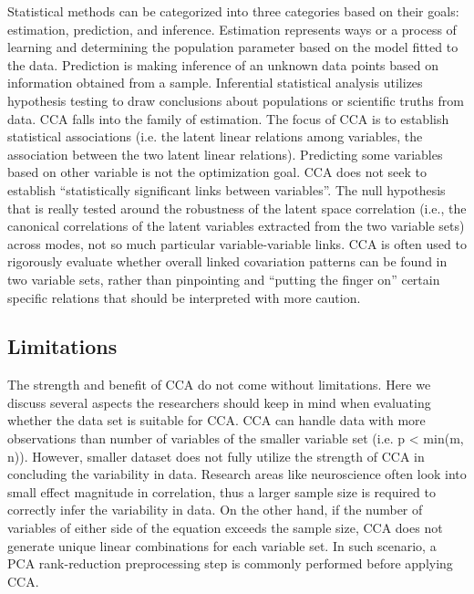 Statistical methods can be categorized into three categories based on their goals: estimation, prediction, and inference.  Estimation represents ways or a process of learning and determining the population parameter based on the model fitted to the data. Prediction is making inference of an unknown data points based on information obtained from a sample. Inferential statistical analysis utilizes hypothesis testing to draw conclusions about populations or scientific truths from data. CCA falls into the family of estimation. The focus of CCA is to establish statistical associations (i.e. the latent linear relations among variables, the association between the two latent linear relations). Predicting some variables based on other variable is not the optimization goal. CCA does not seek to establish “statistically significant links between variables”. The null hypothesis that is really tested around the robustness of the latent space correlation (i.e., the canonical correlations of the latent variables extracted from the two variable sets) across modes, not so much particular variable-variable links. CCA is often used to rigorously evaluate whether overall linked covariation patterns can be found in two variable sets, rather than pinpointing and “putting the finger on” certain specific relations that should be interpreted with more caution.



\subsection{Limitations}
\label{cca:limitations}
The strength and benefit of CCA do not come without limitations. Here we discuss several aspects the researchers should keep in mind when evaluating whether the data set is suitable for CCA. CCA can handle data with more observations than number of variables of the smaller variable set (i.e. p < min(m, n)). However, smaller dataset does not fully utilize the strength of CCA in concluding the variability in data. Research areas like neuroscience often look into small effect magnitude in correlation, thus a larger sample size is required to correctly infer the variability in data. On the other hand, if the number of variables of either side of the equation exceeds the sample size, CCA does not generate unique linear combinations for each variable set.  In such scenario, a PCA rank-reduction preprocessing step is commonly performed before applying CCA. 

